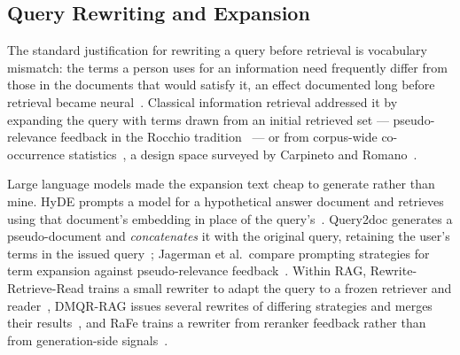 

\subsection{Query Rewriting and Expansion}

The standard justification for rewriting a query before retrieval is vocabulary
mismatch: the terms a person uses for an information need frequently differ from
those in the documents that would satisfy it, an effect documented long before
retrieval became neural~\cite{furnas1987vocabulary}. Classical information
retrieval addressed it by expanding the query with terms drawn from an initial
retrieved set --- pseudo-relevance feedback in the Rocchio
tradition~\cite{rocchio1971relevance} --- or from corpus-wide co-occurrence
statistics~\cite{xu1996localglobal}, a design space surveyed by Carpineto and
Romano~\cite{carpineto2012survey}.

Large language models made the expansion text cheap to generate rather than
mine. HyDE prompts a model for a hypothetical answer document and retrieves
using that document's embedding in place of the query's~\cite{gao2023hyde}.
Query2doc generates a pseudo-document and \emph{concatenates} it with the
original query, retaining the user's terms in the issued
query~\cite{wang2023query2doc}; Jagerman et al.\ compare prompting strategies
for term expansion against pseudo-relevance
feedback~\cite{jagerman2023expansion}. Within RAG,
Rewrite-Retrieve-Read trains a small rewriter to adapt the query to a frozen
retriever and reader~\cite{ma2023rewrite}, DMQR-RAG issues several rewrites of
differing strategies and merges their results~\cite{gao2024dmqr}, and RaFe
trains a rewriter from reranker feedback rather than from generation-side
signals~\cite{ma2023rafe}.

